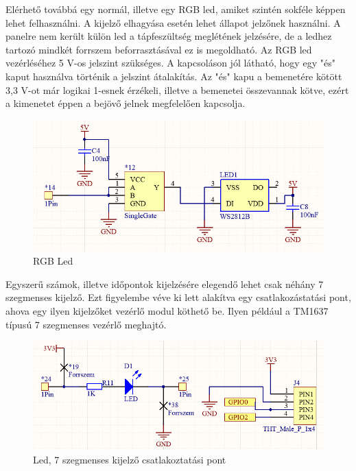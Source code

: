 Elérhető továbbá egy normál, illetve egy RGB led, amiket szintén sokféle képpen lehet felhasználni. A kijelző elhagyása esetén lehet állapot jelzőnek használni. A panelre nem került külön led a tápfeszültség meglétének jelzésére, de a ledhez tartozó mindkét forrszem beforrasztásával ez is megoldható. Az RGB led vezérléséhez 5 V-os jelszint szükséges. A kapcsoláson jól látható, hogy egy "és" kaput használva történik a jelszint átalakítás. Az "és" kapu a bemenetére kötött 3,3 V-ot már logikai 1-esnek érzékeli, illetve a bemenetei összevannak kötve, ezért a kimenetet éppen a bejövő jelnek megfelelően kapcsolja.
\begin{figure}[!ht]
    \centering
    \includegraphics[width=150mm, keepaspectratio]{figures/rgb_led.png}
    \caption{RGB Led}
    \label{fig:power_supply}
\end{figure}
Egyszerű számok, illetve időpontok kijelzésére elegendő lehet csak néhány 7 szegmenses kijelző. Ezt figyelembe véve ki lett alakítva egy csatlakozástatási pont, ahova egy ilyen kijelzőket vezérlő modul köthető be. Ilyen például a TM1637 típusú 7 szegmenses vezérlő meghajtó.
\begin{figure}[!ht]
    \centering
    \includegraphics[width=150mm, keepaspectratio]{figures/led_connector.png}
    \caption{Led, 7 szegmenses kijelző csatlakoztatási pont}
    \label{fig:led_7segment}
\end{figure}



